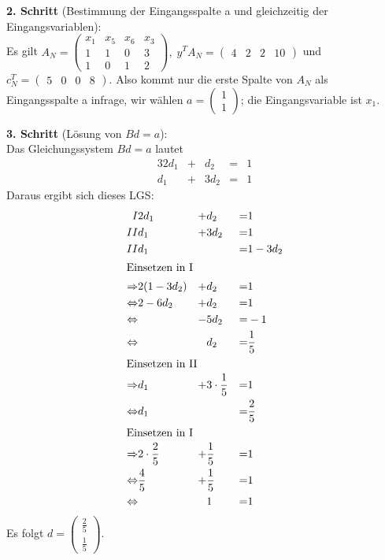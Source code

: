 \documentclass[10pt,a4paper,oneside,ngerman,numbers=noenddot]{scrartcl}
\begin{document}
		\textbf{2. Schritt} (Bestimmung der Eingangsspalte a und gleichzeitig der Eingangsvariablen):\\
		Es gilt $A_{N} = \begin{pmatrix} x_{1} & x_{5} & x_{6} & x_{3} \\ 1 & 1 & 0 & 3 \\ 1 & 0 & 1 & 2 \end{pmatrix},\; y^{T}A_{N} = \begin{pmatrix} 4 & 2 & 2 & 10 \end{pmatrix}$ und $c_{N}^{T} = \begin{pmatrix} 5 & 0 & 0 & 8\end{pmatrix}$. Also kommt nur die erste Spalte von $A_{N}$ als Eingangsspalte a infrage, wir wählen $a = \begin{pmatrix} 1 \\ 1 \end{pmatrix}$; die Eingangsvariable ist $x_{1}$.
		
		\textbf{3. Schritt} (Lösung von $Bd = a$):\\
		Das Gleichungssystem $Bd = a$ lautet
		\begin{alignat*}{3}
			2d_{1} &+& d_{2} &=& 1\\
			d_{1} &+& 3d_{2} &=& 1
		\end{alignat*}
		Daraus ergibt sich dieses LGS:
		\begin{alignat*}{3}
			I & 2d_{1} &+& d_{2} &=& 1 \\
			II & d_{1} &+& 3d_{2} &=& 1 \\
			II & d_{1} && &=& 1 - 3d_{2} \\
			\intertext{Einsetzen in I}
			\Rightarrow & 2(1 - 3d_{2}) &+& d_{2} &=& 1 \\
			\Leftrightarrow & 2 - 6d_{2} &+& d_{2} &=& 1 \\
			\Leftrightarrow & &-& 5d_{2} &=& -1 \\
			\Leftrightarrow & && d_{2} &=& \frac{1}{5} \\
			\intertext{Einsetzen in II}
			\Rightarrow & d_{1} &+& 3 \cdot \frac{1}{5} &=& 1 \\
			\Leftrightarrow & d_{1} && &=& \frac{2}{5} \\
			\intertext{Einsetzen in I}
			\Rightarrow & 2 \cdot \frac{2}{5} &+& \frac{1}{5} &=& 1 \\
			\Leftrightarrow & \frac{4}{5} &+& \frac{1}{5} &=& 1 \\
			\Leftrightarrow & && 1 &=& 1
		\end{alignat*}
		Es folgt $d = \begin{pmatrix} \frac{2}{5} \\ \frac{1}{5} \end{pmatrix}$.
		
\end{document}
